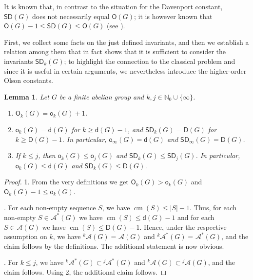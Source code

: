 \documentclass{amsart}
\newtheorem{lem}[thm]{Lemma}
\theoremstyle{definition}
\numberwithin{equation}{section}
\begin{document}
It is known that, in contrast to the situation for the Davenport constant,
${\mathsf{SD}}(G)$ does not necessarily equal ${\mathsf{O}}(G)$; it is however known that ${\mathsf{O}}(G)-1 \le {\mathsf{SD}}(G)\le {\mathsf{O}}(G)$ (see \cite{baliski,baginski}).

First, we collect some facts on the just defined invariants,
and then we establish a relation among them that in fact shows that it is sufficient to consider the invariants ${\mathsf{SD}}_k(G)$; to highlight the connection to the classical problem and since it is useful in certain arguments, we nevertheless introduce the higher-order Olson constants.

\begin{lem}
\label{lr_lem_basic0}
Let $G$ be a finite abelian group and $k,j \in \mathbb{N}_0 \cup \{\infty\}$.
\begin{enumerate}
\item ${\mathsf{O}}_k(G)={\mathsf{o}}_k(G)+1$.
\item ${\mathsf{o}}_k(G)={\mathsf{d}}(G)$ for $k \ge {\mathsf{d}}(G)-1$, and ${\mathsf{SD}}_k(G)={\mathsf{D}}(G)$ for $k \ge {\mathsf{D}}(G)-1$. In particular, ${\mathsf{o}}_{\infty}(G)={\mathsf{d}}(G)$ and ${\mathsf{SD}}_{\infty}(G)={\mathsf{D}}(G)$.
\item If $k\le j$, then ${\mathsf{o}}_k(G)\le {\mathsf{o}}_{j}(G)$ and ${\mathsf{SD}}_k(G)\le {\mathsf{SD}}_{j}(G)$. In particular, ${\mathsf{o}}_k(G)\le {\mathsf{d}}(G)$ and ${\mathsf{SD}}_k(G)\le {\mathsf{D}}(G)$.
\end{enumerate}
\end{lem}
\begin{proof}
1. From the very definitions we get  ${\mathsf{O}}_k(G) > {\mathsf{o}}_k(G)$ and ${\mathsf{O}}_k(G)-1\le {\mathsf{o}}_k(G)$.

. For each non-empty sequence $S$, we have $\operatorname{cm}(S)\le |S|-1$.
Thus, for each non-empty $S\in {{}^{{}}\!\mathcal{A}^{\ast}} (G)$ we have $\operatorname{cm}(S)\le {\mathsf{d}}(G)-1$
and for each $S\in {{}^{{}}\!\mathcal{A}} (G)$ we have $\operatorname{cm}(S)\le {\mathsf{D}}(G)-1$.
Hence, under the respective assumption on $k$, we have ${{}^{{k}}\!\mathcal{A}} (G) = {{}^{{}}\!\mathcal{A}} (G)$ and ${{}^{{k}}\!\mathcal{A}^{\ast}} (G) = {{}^{{}}\!\mathcal{A}^{\ast}} (G)$, and the claim follows by the definitions. The additional statement is now obvious.

. For $k \le j$, we have ${{}^{{k}}\!\mathcal{A}^{\ast}} (G) \subset {{}^{{j}}\!\mathcal{A}^{\ast}} (G)$ and
${{}^{{k}}\!\mathcal{A}} (G) \subset {{}^{{j}}\!\mathcal{A}} (G)$, and the claim follows.
Using 2, the additional claim follows.
\end{proof}
\end{document}
